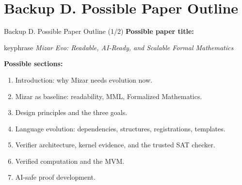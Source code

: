 \documentclass[aspectratio=169,11pt]{beamer}
\begin{document}
\section{Backup D. Possible Paper Outline}
\begin{frame}[fragile,t]{Backup D. Possible Paper Outline (1/2)}
\smallskip
\textbf{Possible paper title:}
\begin{center}
\begin{beamercolorbox}[rounded=true,sep=2.5mm,wd=0.9\textwidth]{keyphrase}
\centering\itshape Mizar Evo: Readable, AI-Ready, and Scalable Formal Mathematics
\end{beamercolorbox}
\end{center}
\smallskip
\textbf{Possible sections:}
\begin{enumerate}
\setlength{\itemsep}{1pt}
\setlength{\parsep}{0pt}
\setlength{\parskip}{0pt}
\item Introduction: why Mizar needs evolution now.
\item Mizar as baseline: readability, MML, Formalized Mathematics.
\item Design principles and the three goals.
\item Language evolution: dependencies, structures, registrations, templates.
\item Verifier architecture, kernel evidence, and the trusted SAT checker.
\item Verified computation and the MVM.
\item AI-safe proof development.
\end{enumerate}
\end{frame}
\end{document}
